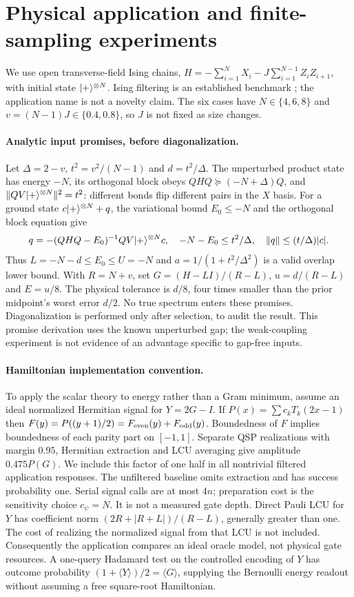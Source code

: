 \section{Physical application and finite-sampling experiments}\label{sec:physical}
We use open transverse-field Ising chains,
$H=-\sum_{i=1}^N X_i-J\sum_{i=1}^{N-1}Z_iZ_{i+1}$,
with initial state $\lvert +\rangle^{\otimes N}$. Ising filtering is an established
benchmark \cite{QETU}; the application name is not a novelty claim.
The six cases have $N\in\{4,6,8\}$ and
$v=(N-1)J\in\{0.4,0.8\}$, so $J$ is not fixed as size changes.

\paragraph{Analytic input promises, before diagonalization.}
Let $\Delta=2-v$, $t^2=v^2/(N-1)$ and $d=t^2/\Delta$.
The unperturbed product state has energy $-N$, its orthogonal block
obeys $QHQ\succeq(-N+\Delta)Q$, and
$\|QV\lvert +\rangle^{\otimes N}\|^2=t^2$: different bonds flip different pairs
in the $X$ basis. For a ground state $c\lvert +\rangle^{\otimes N}+q$,
the variational bound $E_0\leq-N$ and the orthogonal block equation give
\[
 q=-(QHQ-E_0)^{-1}QV\lvert +\rangle^{\otimes N}c,\quad
 -N-E_0\leq t^2/\Delta,\quad \|q\|\leq(t/\Delta)|c|.
\]
Thus $L=-N-d\leq E_0\leq U=-N$ and
$a=1/(1+t^2/\Delta^2)$ is a valid overlap lower bound.
With $R=N+v$, set $G=(H-LI)/(R-L)$, $u=d/(R-L)$ and $E=u/8$.
The physical tolerance is $d/8$, four times smaller than the prior
midpoint's worst error $d/2$. No true spectrum enters these promises.
Diagonalization is performed only after selection, to audit the result.
This promise derivation uses the known unperturbed gap; the weak-coupling
experiment is not evidence of an advantage specific to gap-free inputs.

\paragraph{Hamiltonian implementation convention.}
To apply the scalar theory to energy rather than a Gram minimum, assume
an ideal normalized Hermitian signal for $Y=2G-I$.
If $P(x)=\sum c_kT_k(2x-1)$ then
$F(y)=P((y+1)/2)=F_{\rm even}(y)+F_{\rm odd}(y)$.
Boundedness of $F$ implies boundedness of each parity part on $[-1,1]$.
Separate QSP realizations with margin $0.95$, Hermitian extraction and
LCU averaging give amplitude $0.475P(G)$. We include this factor of
one half in all nontrivial filtered application responses. The unfiltered
baseline omits extraction and has success probability one. Serial signal calls
are at most $4n$; preparation cost is the sensitivity choice $c_\psi=N$.
It is not a measured gate depth. Direct Pauli LCU for $Y$ has coefficient
norm $(2R+|R+L|)/(R-L)$, generally greater than one. The cost of realizing
the normalized signal from that LCU is not included. Consequently the
application compares an ideal oracle model, not physical gate resources.
A one-query Hadamard test on the controlled encoding of $Y$ has outcome
probability $(1+\langle Y\rangle)/2=\langle G\rangle$, supplying the
Bernoulli energy readout without assuming a free square-root Hamiltonian.

